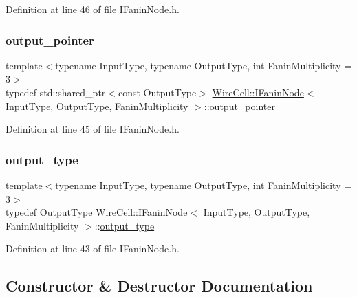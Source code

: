 Definition at line 46 of file I\+Fanin\+Node.\+h.

\mbox{\label{class_wire_cell_1_1_i_fanin_node_a748d9cd1916dda1cb12c3376b229f906}} 
\subsubsection{\texorpdfstring{output\+\_\+pointer}{output\_pointer}}
{\footnotesize\ttfamily template$<$typename Input\+Type, typename Output\+Type, int Fanin\+Multiplicity = 3$>$ \\
typedef std\+::shared\+\_\+ptr$<$const Output\+Type$>$ \hyperlink{class_wire_cell_1_1_i_fanin_node}{Wire\+Cell\+::\+I\+Fanin\+Node}$<$ Input\+Type, Output\+Type, Fanin\+Multiplicity $>$\+::\hyperlink{class_wire_cell_1_1_i_fanin_node_a748d9cd1916dda1cb12c3376b229f906}{output\+\_\+pointer}}



Definition at line 45 of file I\+Fanin\+Node.\+h.

\mbox{\label{class_wire_cell_1_1_i_fanin_node_ab0058a83fd6ff641a73f24d4fa7bbd9d}} 
\subsubsection{\texorpdfstring{output\+\_\+type}{output\_type}}
{\footnotesize\ttfamily template$<$typename Input\+Type, typename Output\+Type, int Fanin\+Multiplicity = 3$>$ \\
typedef Output\+Type \hyperlink{class_wire_cell_1_1_i_fanin_node}{Wire\+Cell\+::\+I\+Fanin\+Node}$<$ Input\+Type, Output\+Type, Fanin\+Multiplicity $>$\+::\hyperlink{class_wire_cell_1_1_i_fanin_node_ab0058a83fd6ff641a73f24d4fa7bbd9d}{output\+\_\+type}}



Definition at line 43 of file I\+Fanin\+Node.\+h.



\subsection{Constructor \& Destructor Documentation}
\mbox{\label{class_wire_cell_1_1_i_fanin_node_a95c4f9e85f09e8c0e438bf92cc189940}} 
